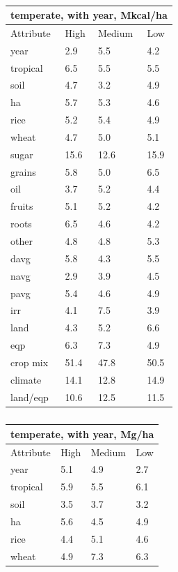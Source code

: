 \documentclass[12pt]{article}
\begin{document}
\begin{table}[h!]
\parbox{.45\linewidth} {
\centering
\begin{tabular}{llll}
\toprule
\multicolumn{4}{c}{\textbf{temperate, with year, Mkcal/ha}} \\
\midrule
Attribute & High & Medium & Low \\
\midrule
year & 2.9 & 5.5 & 4.2 \\
tropical & 6.5 & 5.5 & 5.5 \\
soil & 4.7 & 3.2 & 4.9 \\
ha & 5.7 & 5.3 & 4.6 \\
rice & 5.2 & 5.4 & 4.9 \\
wheat & 4.7 & 5.0 & 5.1 \\
sugar & 15.6 & 12.6 & 15.9 \\
grains & 5.8 & 5.0 & 6.5 \\
oil & 3.7 & 5.2 & 4.4 \\
fruits & 5.1 & 5.2 & 4.2 \\
roots & 6.5 & 4.6 & 4.2 \\
other & 4.8 & 4.8 & 5.3 \\
davg & 5.8 & 4.3 & 5.5 \\
navg & 2.9 & 3.9 & 4.5 \\
pavg & 5.4 & 4.6 & 4.9 \\
irr & 4.1 & 7.5 & 3.9 \\
land & 4.3 & 5.2 & 6.6 \\
eqp & 6.3 & 7.3 & 4.9 \\
\midrule
crop mix & 51.4 & 47.8 & 50.5 \\
climate & 14.1 & 12.8 & 14.9 \\
land/eqp & 10.6 & 12.5 & 11.5 \\
\bottomrule
\end{tabular}
\caption{ }
\label{k.wy.temp_percentages}
}
\parbox{.45\linewidth} {
\centering
\begin{tabular}{llll}
\toprule
\multicolumn{4}{c}{\textbf{temperate, with year, Mg/ha}} \\
\midrule
Attribute & High & Medium & Low \\
\midrule
year & 5.1 & 4.9 & 2.7 \\
tropical & 5.9 & 5.5 & 6.1 \\
soil & 3.5 & 3.7 & 3.2 \\
ha & 5.6 & 4.5 & 4.9 \\
rice & 4.4 & 5.1 & 4.6 \\
wheat & 4.9 & 7.3 & 6.3 \\

\end{tabular}}
\end{table}
\end{document}
